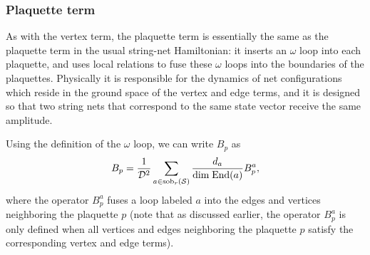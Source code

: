 \subsubsection{Plaquette term}

As with the vertex term, the plaquette term is essentially the same as the plaquette term in the usual string-net Hamiltonian: 
it inserts an $\omega$ loop 
into each plaquette, and uses local relations to fuse these $\omega$ loops into the boundaries of the plaquettes. 
Physically it is responsible for the dynamics of net configurations which reside in the ground space of the vertex and edge terms, 
and it is designed so that two string nets that correspond to the same state vector receive the same amplitude. 

Using the definition of the $\omega$ loop, we can write $B_p$ as 
\begin{align} \label{plaquette_term_defn}
B_p =\frac{1}{\mathcal{D}^2} \sum_{a \in \text{sob}_r(\mathcal{S})} \frac{d_a}{\text{dim} \; \text{End}(a)} B^a_p, 
\end{align}
where the operator $B_p^a$ fuses a loop labeled $a$ into the edges and vertices neighboring the plaquette $p$ (note that 
as discussed earlier, the operator $B_p^a$ is only defined when all vertices and edges neighboring the plaquette $p$ satisfy the corresponding vertex and edge terms).

